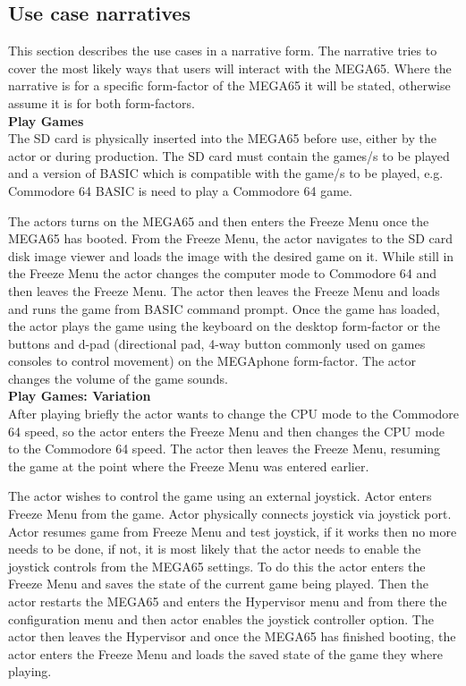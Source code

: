 \subsection{Use case narratives}
This section describes the use cases in a narrative form. The narrative tries to cover the most likely ways that users will interact with the MEGA65. Where the narrative is for a specific form-factor of the MEGA65 it will be stated, otherwise assume it is for both form-factors. \\

\textbf{Play Games}\\
The SD card is physically inserted into the MEGA65 before use, either by the actor or during production. The SD card must contain the games/s to be played and a version of BASIC which is compatible with the game/s to be played, e.g. Commodore 64 BASIC is need to play a Commodore 64 game.

The actors turns on the MEGA65 and then enters the Freeze Menu once the MEGA65 has booted. From the Freeze Menu, the actor navigates to the SD card disk image viewer and loads the image with the desired game on it. While still in the Freeze Menu the actor changes the computer mode to Commodore 64 and then leaves the Freeze Menu. The actor then leaves the Freeze Menu and loads and runs the game from BASIC command prompt. Once the game has loaded, the actor plays the game using the keyboard on the desktop form-factor or the buttons and d-pad (directional pad, 4-way button commonly used on games consoles to control movement) on the MEGAphone form-factor. The actor changes the volume of the game sounds.\\

\textbf{Play Games: Variation}\\
After playing briefly the actor wants to change the CPU mode to the Commodore 64 speed, so the actor enters the Freeze Menu and then changes the CPU mode to the Commodore 64 speed. The actor then leaves the Freeze Menu, resuming the game at the point where the Freeze Menu was entered earlier. 

The actor wishes to control the game using an external joystick. Actor enters Freeze Menu from the game. Actor physically connects joystick via joystick port. Actor resumes game from Freeze Menu and test joystick, if it works then no more needs to be done, if not, it is most likely that the actor needs to enable the joystick controls from the MEGA65 settings. To do this the actor enters the Freeze Menu and saves the state of the current game being played. Then the actor restarts the MEGA65 and enters the Hypervisor menu and from there the configuration menu and then actor enables the joystick controller option. The actor then leaves the Hypervisor and once the MEGA65 has finished booting, the actor enters the Freeze Menu and loads the saved state of the game they where playing. 

